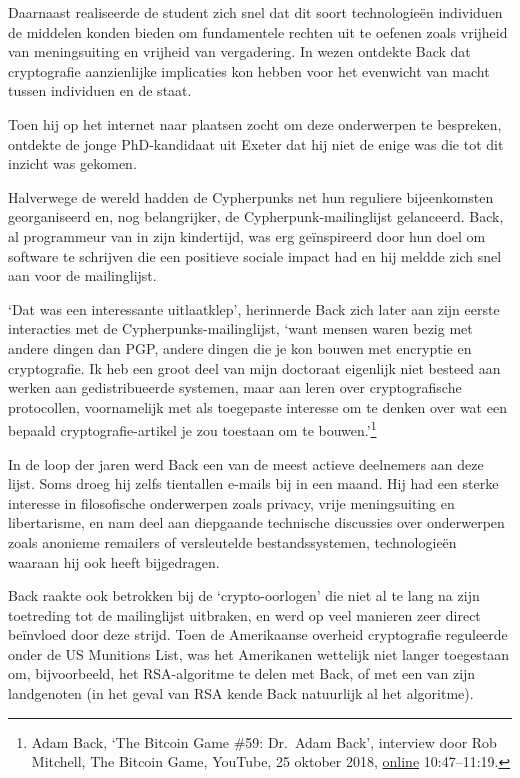 \documentclass[smalldemyvopaper,11pt,twoside,onecolumn,openright,extrafontsizes,hidelinks]{memoir}
\begin{document}
Daarnaast realiseerde de student zich snel dat dit soort technologieën
individuen de middelen konden bieden om fundamentele rechten uit te
oefenen zoals vrijheid van meningsuiting en vrijheid van vergadering. In
wezen ontdekte Back dat cryptografie aanzienlijke implicaties kon hebben
voor het evenwicht van macht tussen individuen en de staat.

Toen hij op het internet naar plaatsen zocht om deze onderwerpen te
bespreken, ontdekte de jonge PhD-kandidaat uit Exeter dat hij niet de
enige was die tot dit inzicht was gekomen.

Halverwege de wereld hadden de Cypherpunks net hun reguliere
bijeenkomsten georganiseerd en, nog belangrijker, de
Cypherpunk-mailinglijst gelanceerd. Back, al programmeur van in zijn
kindertijd, was erg geïnspireerd door hun doel om software te schrijven
die een positieve sociale impact had en hij meldde zich snel aan voor de
mailinglijst.

`Dat was een interessante uitlaatklep', herinnerde Back zich later aan
zijn eerste interacties met de Cypherpunks-mailinglijst, `want mensen
waren bezig met andere dingen dan PGP, andere dingen die je kon bouwen
met encryptie en cryptografie. Ik heb een groot deel van mijn doctoraat
eigenlijk niet besteed aan werken aan gedistribueerde systemen, maar aan
leren over cryptografische protocollen, voornamelijk met als toegepaste
interesse om te denken over wat een bepaald cryptografie-artikel je zou
toestaan om te bouwen.'\footnote{Adam Back, `The Bitcoin Game \#59:
  Dr.~Adam Back', interview door Rob Mitchell, The Bitcoin Game,
  YouTube, 25 oktober 2018,
  \href{https://www.youtube.com/watch?v=xxYsRjanphA&t=647s}{online}
  10:47--11:19.}

In de loop der jaren werd Back een van de meest actieve deelnemers aan
deze lijst. Soms droeg hij zelfs tientallen e-mails bij in een maand.
Hij had een sterke interesse in filosofische onderwerpen zoals privacy,
vrije meningsuiting en libertarisme, en nam deel aan diepgaande
technische discussies over onderwerpen zoals anonieme remailers of
versleutelde bestandssystemen, technologieën waaraan hij ook heeft
bijgedragen.

Back raakte ook betrokken bij de `crypto-oorlogen' die niet al te lang
na zijn toetreding tot de mailinglijst uitbraken, en werd op veel
manieren zeer direct beïnvloed door deze strijd. Toen de Amerikaanse
overheid cryptografie reguleerde onder de US Munitions List, was het
Amerikanen wettelijk niet langer toegestaan om, bijvoorbeeld, het
RSA-algoritme te delen met Back, of met een van zijn landgenoten (in het
geval van RSA kende Back natuurlijk al het algoritme).
\end{document}

